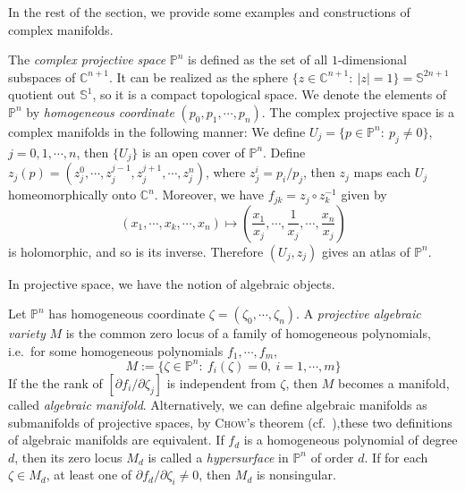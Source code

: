 In the rest of the section, we provide some examples and constructions of complex manifolds.

\begin{cons}
    The \emph{complex projective space} $\mathbb{P}^n$ is defined as the set of all $1$-dimensional subspaces of $\mathbb{C}^{n+1}$.
    It can be realized as the sphere $\{z\in\mathbb{C}^{n+1}:\ |z|=1\}=\mathbb{S}^{2n+1}$ quotient out $\mathbb{S}^1$, so it is a compact topological space.
    We denote the elements of $\mathbb{P}^n$ by \emph{homogeneous coordinate} $(p_0,p_1,\cdots,p_n)$.
    The complex projective space is a complex manifolds in the following manner:
    We define $U_j=\{p\in\mathbb{P}^n:\ p_j\neq 0\}$, $j=0,1,\cdots,n$, then $\{U_j\}$ is an open cover of $\mathbb{P}^n$.
    Define $z_j(p)=(z_j^0,\cdots,z_j^{j-1},z_j^{j+1},\cdots,z_j^n)$, where $z_j^i=p_i/p_j$, then $z_j$ maps each $U_j$ homeomorphically onto $\mathbb{C}^n$.
    Moreover, we have $f_{jk}=z_j\circ z_k^{-1}$ given by
    \[(x_1,\cdots,x_k,\cdots,x_n)\mapsto\left(\frac{x_1}{x_j},\cdots,\frac{1}{x_j},\cdots,\frac{x_n}{x_j}\right)\]
    is holomorphic, and so is its inverse.
    Therefore $(U_j,z_j)$ gives an atlas of $\mathbb{P}^n$.
\end{cons}

In projective space, we have the notion of algebraic objects.

\begin{defn}
    Let $\mathbb{P}^n$ has homogeneous coordinate $\zeta=(\zeta_0,\cdots,\zeta_n)$.
    A \emph{projective algebraic variety} $M$ is the common zero locus of a family of homogeneous polynomials, i.e.\ for some homogeneous polynomials $f_1,\cdots,f_m$, 
    \[M:=\{\zeta\in\mathbb{P}^n:\ f_i(\zeta)=0,\ i=1,\cdots,m\}\]
    If the the rank of $[\partial{f_i}/\partial{\zeta_j}]$ is independent from $\zeta$, then $M$ becomes a manifold, called \emph{algebraic manifold}.
    Alternatively, we can define algebraic manifolds as submanifolds of projective spaces, by \textsc{Chow}'s theorem (cf.\ \cite[Section~3.3]{Griffiths74}),these two definitions of algebraic manifolds are equivalent.
    If $f_d$ is a homogeneous polynomial of degree $d$, then its zero locus $M_d$ is called a \emph{hypersurface} in $\mathbb{P}^n$ of order $d$.
    If for each $\zeta\in M_d$, at least one of $\partial f_d/\partial\zeta_i\neq 0$, then $M_d$ is nonsingular.
\end{defn}


